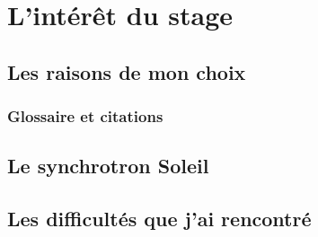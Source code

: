 \chapter{L'intérêt du stage}
	
	\minitoc
	





\section{Les raisons de mon choix}
	\subsection{Glossaire et citations}

	

\section{Le synchrotron Soleil}
\blindtext
\section{Les difficultés que j'ai rencontré}
\section{}


